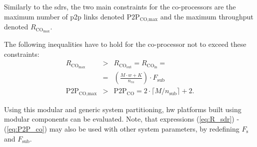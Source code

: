 \documentclass[journal]{IEEEtran}
\begin{document}
Similarly to the \glspl{sdr}, the two main constraints for the co-processors are the maximum number of \gls{p2p} links denoted $\text{P2P}_\text{CO,max}$ and the maximum throughput denoted $R_{\text{CO}_\text{max}}$.	

The following inequalities have to hold for the co-processor not to exceed these constraints:
\begin{eqnarray}
R_{\text{CO}_\text{max}} &>& R_{\text{CO}_\text{out}}=R_{\text{CO}_\text{in}}=\nonumber\\
&=&\left(\frac{M\cdot w+K}{n_\text{co}}\right)\cdot F_\text{sub}\label{eq:R_co}\\
\text{P2P}_\text{CO,max} &>& \text{P2P}_\text{CO} = 2\cdot \lceil M/n_\text{sub}\rceil + 2. \label{eq:P2P_co}
\end{eqnarray}

%
%
%
%
%

Using this modular and generic system partitioning, \gls{hw} platforms built using modular components can be evaluated.
Note, that expressions (\ref{eq:R_sdr}) - (\ref{eq:P2P_co}) may also be used with other system parameters, \eg by redefining $F_\text{s}$ and $F_\text{sub}$.
%
%
\end{document}
